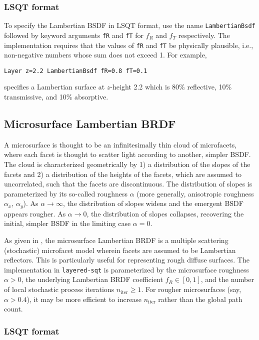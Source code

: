 \documentclass[
    twoside,
    twocolumn,
    letterpaper,
    defaultfont,
    rmheading,
    10pt]{article}
\begin{document}
\subsubsection{LSQT format}

To specify the Lambertian BSDF in LSQT format, use the name
\texttt{LambertianBsdf} followed by keyword arguments \texttt{fR}
and \texttt{fT} for $f_R$ and $f_T$ respectively. The implementation
requires that the values of \texttt{fR} and \texttt{fT} be physically
plausible, i.e., non-negative numbers whose sum does not exceed 1.
For example,
\begin{verbatim}
Layer z=2.2 LambertianBsdf fR=0.8 fT=0.1
\end{verbatim}
specifies a Lambertian surface at $z$-height 2.2 which is 80\% reflective,
10\% transmissive, and 10\% absorptive. 

\subsection{Microsurface Lambertian BRDF}

A microsurface is thought 
to be an infinitesimally thin cloud of microfacets, where each facet 
is thought to scatter light according to another, simpler BSDF. The 
cloud is characterized geometrically by 1) a distribution of the
slopes of the facets and 2) a distribution of the heights of the facets,
which are assumed to uncorrelated, such that the facets are discontinuous. 
The distribution of slopes is parameterized by its so-called roughness
$\alpha$ (more generally, anisotropic roughness $\alpha_x$, $\alpha_y$).
As $\alpha\to\infty$, the distribution of slopes widens and the emergent
BSDF appears rougher. As $\alpha\to0$, the distribution of slopes collapses,
recovering the initial, simpler BSDF in the limiting case $\alpha=0$.

As given in \cite{Heitz:16},
the microsurface Lambertian BRDF is a multiple scattering (stochastic)
microfacet model wherein facets are assumed to be Lambertian reflectors. 
This is particularly useful for representing rough diffuse surfaces. The 
implementation in \texttt{layered-sqt} is parameterized by the 
microsurface roughness $\alpha>0$, the underlying Lambertian BRDF coefficient 
$f_R \in [0,1]$, and the number of local stochastic process 
iterations $n_{\text{iter}} \ge 1$. For rougher microsurfaces 
(say, $\alpha > 0.4$), it may be more efficient to increase 
$n_{\text{iter}}$ rather than the global path count.

\subsubsection{LSQT format}
\end{document}
